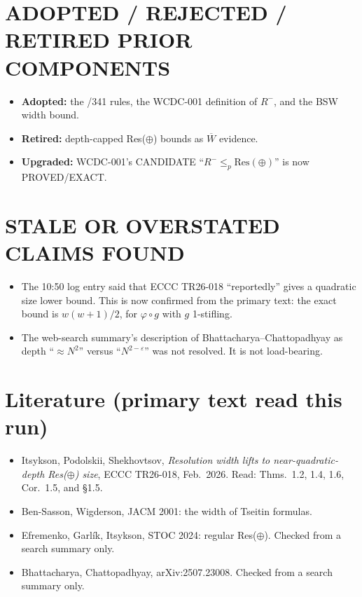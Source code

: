 \documentclass[11pt]{article}
\begin{document}
\section{ADOPTED / REJECTED / RETIRED PRIOR COMPONENTS}
\begin{itemize}
\item \textbf{Adopted:} the /341 rules, the WCDC-001 definition of $R^-$, and the BSW width bound.
\item \textbf{Retired:} depth-capped Res($\oplus$) bounds as $\overline W$ evidence.
\item \textbf{Upgraded:} WCDC-001's CANDIDATE ``$R^-\le_p\mathrm{Res}(\oplus)$'' is now PROVED/EXACT.
\end{itemize}

\section{STALE OR OVERSTATED CLAIMS FOUND}
\begin{itemize}
\item The 10:50 log entry said that ECCC TR26-018 ``reportedly'' gives a quadratic size lower bound. This is now confirmed from the primary text: the exact bound is $w(w+1)/2$, for $\varphi\circ g$ with $g$ 1-stifling.
\item The web-search summary's description of Bhattacharya--Chattopadhyay as depth ``$\approx N^2$'' versus ``$N^{2-\varepsilon}$'' was not resolved. It is not load-bearing.
\end{itemize}

\section{Literature (primary text read this run)}
\begin{itemize}
\item Itsykson, Podolskii, Shekhovtsov, \emph{Resolution width lifts to near-quadratic-depth Res($\oplus$) size}, ECCC TR26-018, Feb.~2026. Read: Thms.~1.2, 1.4, 1.6, Cor.~1.5, and \S1.5.
\item Ben-Sasson, Wigderson, JACM 2001: the width of Tseitin formulas.
\item Efremenko, Garl\'ik, Itsykson, STOC 2024: regular Res($\oplus$). Checked from a search summary only.
\item Bhattacharya, Chattopadhyay, arXiv:2507.23008. Checked from a search summary only.
\end{itemize}
\end{document}
